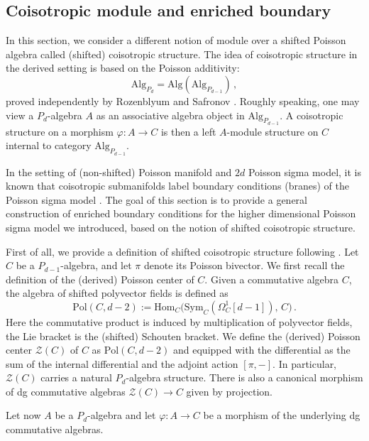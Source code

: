 \documentclass[11pt]{article}
\numberwithin{equation}{section}
\begin{document}
\subsection{Coisotropic module and enriched boundary}
\label{sec:enriched_bdy_coiso}
In this section, we consider a different notion of module over a shifted Poisson algebra called (shifted) coisotropic structure. The idea of coisotropic structure in the derived setting is based on the Poisson additivity:
\begin{equation}
\mathrm{Alg}_{P_d} = \mathrm{Alg}(\mathrm{Alg}_{P_{d-1}})\,,
\end{equation}
proved independently by Rozenblyum and Safronov \cite{safronov2018braces}. Roughly speaking, one may view a $P_d$-algebra $A$ as an associative algebra object in $\mathrm{Alg}_{P_{d-1}}$. A coisotropic structure on a morphism $\varphi: A\to C$ is then a left $A$-module structure on $C$ internal to category $\mathrm{Alg}_{P_{d-1}}$.

In the setting of (non-shifted) Poisson manifold and $2d$ Poisson sigma model, it is known that coisotropic submanifolds label boundary conditions (branes) of the Poisson sigma model \cite{cattaneo2004coisotropic}. The goal of this section is to provide a general construction of enriched boundary conditions for the higher dimensional Poisson sigma model we introduced, based on the notion of shifted coisotropic structure. 

First of all, we provide a definition of shifted coisotropic structure following \cite{Safronov2017pr}. Let $C$ be a $P_{d-1}$-algebra, and let $\pi$ denote its Poisson bivector. We first recall the definition of the (derived) Poisson center of $C$. Given a commutative algebra $C$, the algebra of shifted polyvector fields is defined as
\begin{equation}
\mathrm{Pol}(C,d-2) := \mathrm{Hom}_C\!\bigl(\mathrm{Sym}_C(\Omega_C^1[d-1]),\,C\bigr)\,.
\end{equation}
Here the commutative product is induced by multiplication of polyvector fields, the Lie bracket is the (shifted) Schouten bracket. We define the (derived) Poisson center $\mathcal{Z}(C)$ of $C$ as $\mathrm{Pol}(C,d-2)$ and equipped with the differential as the sum of the internal differential and the adjoint action $[\pi,-]$. In particular, $\mathcal{Z}(C)$ carries a natural $P_d$-algebra structure. There is also a canonical morphism of dg commutative algebras $\mathcal{Z}(C)\to C$ given by projection.

Let now $A$ be a $P_d$-algebra and let $\varphi \colon A\to C$ be a morphism of the underlying dg commutative algebras.
\end{document}
